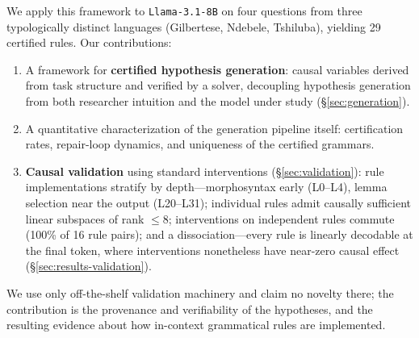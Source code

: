 We apply this framework to \texttt{Llama-3.1-8B} on four questions from
three typologically distinct languages (Gilbertese, Ndebele, Tshiluba),
yielding 29 certified rules. Our contributions:
\begin{enumerate}[leftmargin=*,itemsep=0pt,topsep=2pt]
  \item A framework for \textbf{certified hypothesis generation}: causal
  variables derived from task structure and verified by a solver,
  decoupling hypothesis generation from both researcher intuition and the
  model under study (\S\ref{sec:generation}).
  \item A quantitative characterization of the generation pipeline itself:
  certification rates, repair-loop dynamics, and uniqueness of the
  certified grammars. 
  \item \textbf{Causal validation} using standard interventions
  (\S\ref{sec:validation}): rule implementations stratify by
  depth---morphosyntax early (L0--L4), lemma selection near the output
  (L20--L31); individual rules admit causally sufficient linear subspaces
  of rank $\le 8$; interventions on independent rules commute (100\% of 16
  rule pairs); and a dissociation---every rule is linearly decodable at the
  final token, where interventions nonetheless have near-zero causal
  effect (\S\ref{sec:results-validation}).
\end{enumerate}

We use only off-the-shelf validation machinery and claim no novelty there;
the contribution is the provenance and verifiability of the hypotheses, and
the resulting evidence about how in-context grammatical rules are
implemented.
